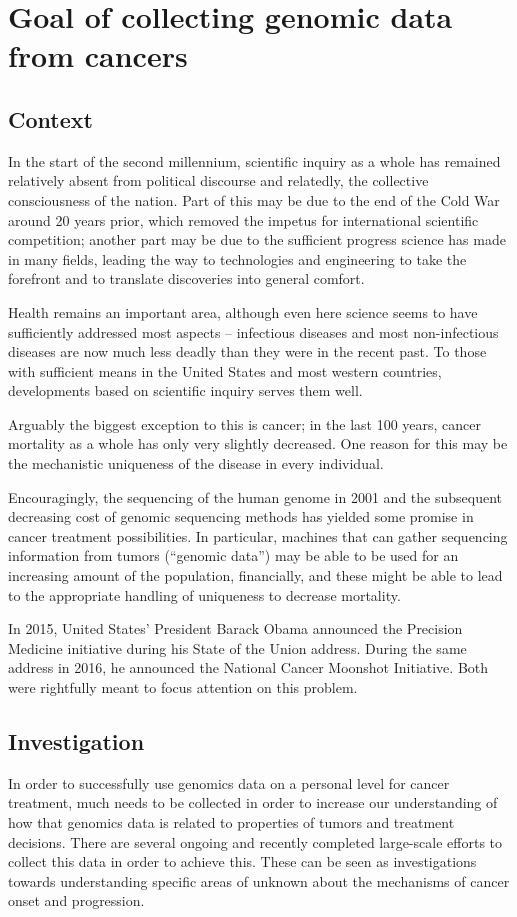 \chapter{Goal of collecting genomic data from cancers}

\section{Context}
In the start of the second millennium, scientific inquiry as a whole
has remained relatively absent from political discourse and relatedly,
the collective consciousness of the nation. Part of this may be due to
the end of the Cold War around 20 years prior, which removed the
impetus for international scientific competition; another part may be
due to the sufficient progress science has made in many fields,
leading the way to technologies and engineering to take the forefront
and to translate discoveries into general comfort.

Health remains an important area, although even here science seems to
have sufficiently addressed most aspects – infectious diseases and
most non-infectious diseases are now much less deadly than they were
in the recent past. To those with sufficient means in the United
States and most western countries, developments based on scientific
inquiry serves them well.

Arguably the biggest exception to this is cancer; in the last 100
years, cancer mortality as a whole has only very slightly
decreased. One reason for this may be the mechanistic uniqueness of
the disease in every individual.

Encouragingly, the sequencing of the human genome in 2001 and the
subsequent decreasing cost of genomic sequencing methods has yielded
some promise in cancer treatment possibilities. In particular,
machines that can gather sequencing information from tumors (“genomic
data”) may be able to be used for an increasing amount of the
population, financially, and these might be able to lead to the
appropriate handling of uniqueness to decrease mortality.

In 2015, United States’ President Barack Obama announced the Precision
Medicine initiative during his State of the Union address. During the
same address in 2016, he announced the National Cancer Moonshot
Initiative. Both were rightfully meant to focus attention on this
problem.

\section{Investigation}
	In order to successfully use genomics data on a personal level
        for cancer treatment, much needs to be collected in order to
        increase our understanding of how that genomics data is
        related to properties of tumors and treatment decisions. There
        are several ongoing and recently completed large-scale efforts
        to collect this data in order to achieve this. These can be
        seen as investigations towards understanding specific areas of
        unknown about the mechanisms of cancer onset and progression.

